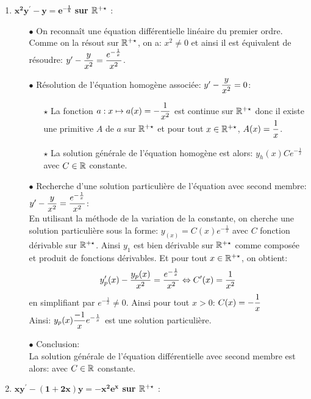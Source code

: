 \documentclass[a4paper, 11pt,reqno]{article}
\begin{document}
\begin{correction}
\begin{enumerate}
\item \textbf{$\mathbf{x^2y^{\prime}-y=e^{-\frac{1}{x}}}$ sur $\mathbb{R}^{+\star}$} :\\
\begin{itemize}
\item[$\bullet$] On reconna\^{i}t une \'equation diff\'erentielle lin\'eaire du premier ordre.\\
\noindent Comme on la r\'esout sur $\mathbb{R}^{+\star}$, on a: $x^2\not= 0$ et ainsi il est \'equivalent de r\'esoudre: $y^{\prime}-\displaystyle\frac{y}{x^2}=\displaystyle\frac{e^{-\frac{1}{x}}}{x^2}$.
\item[$\bullet$] R\'esolution de l'\'equation homog\`{e}ne associ\'ee: $y^{\prime}-\displaystyle\frac{y}{x^2}=0$:
\begin{itemize}
\item[$\star$] La fonction $a: x\mapsto a(x)=-\displaystyle\frac{1}{x^2}$ est continue sur $\mathbb{R}^{+\star}$ donc il existe une primitive $A$ de $a$ sur $\mathbb{R}^{+\star}$ et pour tout $x\in\mathbb{R}^{+\star}$, $A(x)=\displaystyle\frac{1}{x}$.
\item[$\star$] La solution g\'en\'erale de l'\'equation homog\`{e}ne est alors: $y_h(x) Ce^{-\frac{1}{x}}$ avec $C\in\mathbb{R}$ constante.
\end{itemize}
\item[$\bullet$] Recherche d'une solution particuli\`{e}re de l'\'equation avec second membre: $y^{\prime}-\displaystyle\frac{y}{x^2}=\displaystyle\frac{e^{-\frac{1}{x}}}{x^2}$:\\
\noindent En utilisant la m\'ethode de la variation de la constante, on cherche une solution particuli\`{e}re sous la forme: $y_(x)=  C(x)e^{-\frac{1}{x}}$ avec $C$ fonction d\'erivable sur $\mathbb{R}^{+\star}$. Ainsi $y_1$ est bien d\'erivable sur $\mathbb{R}^{+\star}$ comme compos\'ee et produit de fonctions d\'erivables. Et pour tout $x\in\mathbb{R}^{+\star}$, on obtient:
$$y^{\prime}_p(x)-\displaystyle\frac{y_p(x)}{x^2}=\displaystyle\frac{e^{-\frac{1}{x}}}{x^2}\Leftrightarrow C^{\prime}(x)=\displaystyle\frac{1}{x^2}$$
en simplifiant par $e^{-\frac{1}{x}}\not= 0$. Ainsi pour tout $x>0$: $C(x)=-\displaystyle\frac{1}{x}$\\
\noindent Ainsi: $y_p(x) \displaystyle\frac{-1}{x}e^{-\frac{1}{x}}$ est une solution particuli\`{e}re.
\item[$\bullet$] Conclusion:\\
\noindent La solution g\'en\'erale de l'\'equation diff\'erentielle avec second membre est alors:  avec $C\in\mathbb{R}$ constante.
\end{itemize}
\item \textbf{$\mathbf{xy^{\prime}-(1+2x)y=-x^2e^x}$ sur $\mathbb{R}^{+\star}$} :\\

\end{enumerate}
\end{correction}
\end{document}
